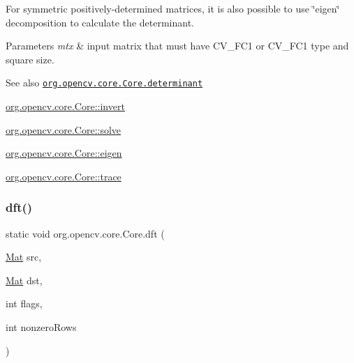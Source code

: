 For symmetric positively-\/determined matrices, it is also possible to use \char`\"{}eigen\char`\"{} decomposition to calculate the determinant.


\begin{DoxyParams}{Parameters}
{\em mtx} & input matrix that must have {\ttfamily C\+V\+\_\+F\+C1} or {\ttfamily C\+V\+\_\+F\+C1} type and square size.\\
\hline
\end{DoxyParams}
\begin{DoxySeeAlso}{See also}
\href{http://docs.opencv.org/modules/core/doc/operations_on_arrays.html#determinant}{\tt org.\+opencv.\+core.\+Core.\+determinant} 

\mbox{\hyperlink{classorg_1_1opencv_1_1core_1_1_core_af7c788172a8e426cf6b6cedc8d828f1b}{org.\+opencv.\+core.\+Core\+::invert}} 

\mbox{\hyperlink{classorg_1_1opencv_1_1core_1_1_core_af6e1ab8eaa1618c30a16e38da739bbeb}{org.\+opencv.\+core.\+Core\+::solve}} 

\mbox{\hyperlink{classorg_1_1opencv_1_1core_1_1_core_ab44f09e696b045957316b9b384ef0c70}{org.\+opencv.\+core.\+Core\+::eigen}} 

\mbox{\hyperlink{classorg_1_1opencv_1_1core_1_1_core_a9c17a12158c59ea65c662cac491c28c3}{org.\+opencv.\+core.\+Core\+::trace}} 
\end{DoxySeeAlso}
\mbox{\label{classorg_1_1opencv_1_1core_1_1_core_a43313221157a3008972a04727a65a58d}} 
\subsubsection{\texorpdfstring{dft()}{dft()}\hspace{0.1cm}{\footnotesize\ttfamily [1/2]}}
{\footnotesize\ttfamily static void org.\+opencv.\+core.\+Core.\+dft (\begin{DoxyParamCaption}\item[{\mbox{\hyperlink{classorg_1_1opencv_1_1core_1_1_mat}{Mat}}}]{src,  }\item[{\mbox{\hyperlink{classorg_1_1opencv_1_1core_1_1_mat}{Mat}}}]{dst,  }\item[{int}]{flags,  }\item[{int}]{nonzero\+Rows }\end{DoxyParamCaption})\hspace{0.3cm}{\ttfamily [static]}}

